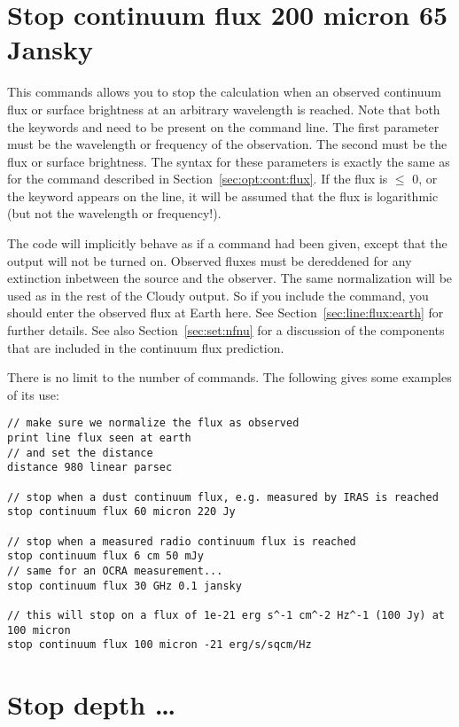 \section{Stop continuum flux 200 micron 65 Jansky}

This commands allows you to stop the calculation when an observed continuum
flux or surface brightness at an arbitrary wavelength is reached. Note that
both the keywords  and  need to be
present on the command line. The first parameter must be the wavelength or
frequency of the observation. The second must be the flux or surface
brightness. The syntax for these parameters is exactly the same as for the
 command described in
Section~\ref{sec:opt:cont:flux}. If the flux is $\leq$ 0, or the keyword
 appears on the line, it will be assumed that the flux is
logarithmic (but not the wavelength or frequency!).

The code will implicitly behave as if a  command had
been given, except that the  output will not be
turned on. Observed fluxes must be dereddened for any extinction inbetween the
source and the observer. The same normalization will be used as in the rest of
the Cloudy output. So if you include the 
command, you should enter the observed flux at Earth here. See
Section~\ref{sec:line:flux:earth} for further details. See also
Section~\ref{sec:set:nfnu} for a discussion of the components that are
included in the continuum flux prediction.

There is no limit to the number of 
commands. The following gives some examples of its use:
\begin{verbatim}
// make sure we normalize the flux as observed
print line flux seen at earth
// and set the distance
distance 980 linear parsec

// stop when a dust continuum flux, e.g. measured by IRAS is reached
stop continuum flux 60 micron 220 Jy

// stop when a measured radio continuum flux is reached
stop continuum flux 6 cm 50 mJy
// same for an OCRA measurement...
stop continuum flux 30 GHz 0.1 jansky

// this will stop on a flux of 1e-21 erg s^-1 cm^-2 Hz^-1 (100 Jy) at 100 micron
stop continuum flux 100 micron -21 erg/s/sqcm/Hz
\end{verbatim}

\section{Stop depth \dots}

